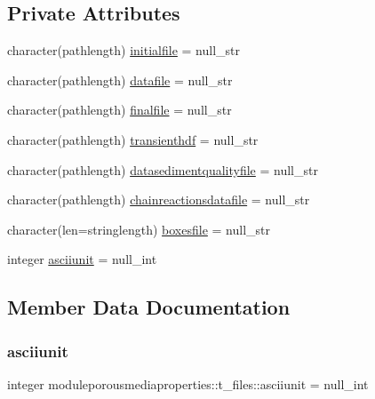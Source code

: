 \subsection*{Private Attributes}
\begin{DoxyCompactItemize}
\item 
character(pathlength) \mbox{\hyperlink{structmoduleporousmediaproperties_1_1t__files_a43112a16a83631dec6d5888d0b6d7589}{initialfile}} = null\+\_\+str
\item 
character(pathlength) \mbox{\hyperlink{structmoduleporousmediaproperties_1_1t__files_ac0bb5e051e520f0fb2ee51fe3e708f35}{datafile}} = null\+\_\+str
\item 
character(pathlength) \mbox{\hyperlink{structmoduleporousmediaproperties_1_1t__files_a6eb95a14b3923230dc5a5c2fd3279527}{finalfile}} = null\+\_\+str
\item 
character(pathlength) \mbox{\hyperlink{structmoduleporousmediaproperties_1_1t__files_a6e96be3f2802c6bc63056691c395f119}{transienthdf}} = null\+\_\+str
\item 
character(pathlength) \mbox{\hyperlink{structmoduleporousmediaproperties_1_1t__files_aa9cddf52ca783b9ef80f8e48424a1633}{datasedimentqualityfile}} = null\+\_\+str
\item 
character(pathlength) \mbox{\hyperlink{structmoduleporousmediaproperties_1_1t__files_a893000dee14263935b2b822ab1e9d9c3}{chainreactionsdatafile}} = null\+\_\+str
\item 
character(len=stringlength) \mbox{\hyperlink{structmoduleporousmediaproperties_1_1t__files_a321310993b90804388a182d323a1ef07}{boxesfile}} = null\+\_\+str
\item 
integer \mbox{\hyperlink{structmoduleporousmediaproperties_1_1t__files_a8c9d9664ce8bf6c58f12021dff6eaa2f}{asciiunit}} = null\+\_\+int
\end{DoxyCompactItemize}


\subsection{Member Data Documentation}
\mbox{\label{structmoduleporousmediaproperties_1_1t__files_a8c9d9664ce8bf6c58f12021dff6eaa2f}} 
\subsubsection{\texorpdfstring{asciiunit}{asciiunit}}
{\footnotesize\ttfamily integer moduleporousmediaproperties\+::t\+\_\+files\+::asciiunit = null\+\_\+int\hspace{0.3cm}{\ttfamily [private]}}

